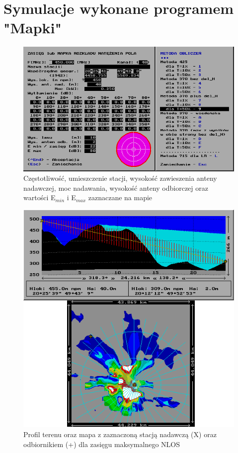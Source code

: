 \documentclass[12pt, a4paper, oneside]{article}
\begin{document}
\section{Symulacje wykonane programem "Mapki"}
\begin{figure}[h!]
\centering
\includegraphics[scale=1]{pics/f1.png}
\caption{Częstotliwość, umieszczenie stacji, wysokość zawieszenia anteny nadawczej, moc nadawania, wysokość anteny odbiorczej oraz wartości E$_{min}$ i E$_{max}$ zaznaczane na mapie}
\end{figure}
\clearpage
\begin{figure}[h!]
\centering
\includegraphics[scale=1]{pics/f2.png}
\caption{Profil terenu oraz mapa z zaznaczoną stacją nadawczą (X) oraz odbiornikiem (+) dla zasięgu maksymalnego NLOS}
\end{figure}
\end{document}
